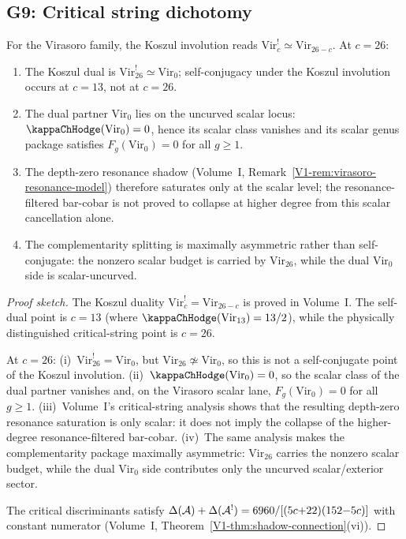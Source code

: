 \subsection{G9: Critical string dichotomy}

\begin{theorem}
For the Virasoro family, the Koszul involution reads
$\mathrm{Vir}_c^! \simeq \mathrm{Vir}_{26-c}$. At $c = 26$:
\begin{enumerate}[label=\textup{(\roman*)}]
\item The Koszul dual is
 $\mathrm{Vir}_{26}^! \simeq \mathrm{Vir}_0$; self-conjugacy under the
 Koszul involution occurs at $c = 13$, not at $c = 26$.
\item The dual partner $\mathrm{Vir}_0$ lies on the uncurved scalar
 locus: $\kappaChHodge(\mathrm{Vir}_0) = 0$, hence its scalar class vanishes
 and its scalar genus package satisfies
 $F_g(\mathrm{Vir}_0) = 0$ for all $g \geq 1$.
\item The depth-zero resonance shadow
 (Volume~I, Remark~\ref{V1-rem:virasoro-resonance-model}) therefore
 saturates only at the scalar level; the resonance-filtered bar-cobar
 is not proved to collapse at higher degree from this scalar
 cancellation alone.
\item The complementarity splitting is maximally asymmetric rather than
 self-conjugate: the nonzero scalar budget is carried by
 $\mathrm{Vir}_{26}$, while the dual $\mathrm{Vir}_0$ side is
 scalar-uncurved.
\end{enumerate}
\end{theorem}

\begin{proof}[Proof sketch]
The Koszul duality $\mathrm{Vir}_c^! = \mathrm{Vir}_{26-c}$ is proved
in Volume~I. The self-dual point is $c = 13$ (where
$\kappaChHodge(\mathrm{Vir}_{13}) = 13/2$), while the physically
distinguished critical-string point is $c = 26$.

At $c = 26$: (i)~$\mathrm{Vir}_{26}^! = \mathrm{Vir}_0$, but
$\mathrm{Vir}_{26} \not\simeq \mathrm{Vir}_0$, so this is not a
self-conjugate point of the Koszul involution.
(ii)~$\kappaChHodge(\mathrm{Vir}_0) = 0$, so the scalar class of the dual
partner vanishes and, on the Virasoro scalar lane,
$F_g(\mathrm{Vir}_0) = 0$ for all $g \ge 1$.
(iii)~Volume~I's critical-string analysis shows that the resulting
depth-zero resonance saturation is only scalar: it does not imply the
collapse of the higher-degree resonance-filtered bar-cobar.
(iv)~The same analysis makes the complementarity package maximally
asymmetric: $\mathrm{Vir}_{26}$ carries the nonzero scalar budget,
while the dual $\mathrm{Vir}_0$ side contributes only the uncurved
scalar/exterior sector.

The critical discriminants satisfy
$\Delta(\mathcal{A}) + \Delta(\mathcal{A}^!) = 6960/[(5c{+}22)(152{-}5c)]$
with constant numerator
(Volume~I, Theorem~\ref{V1-thm:shadow-connection}(vi)).
\end{proof}


